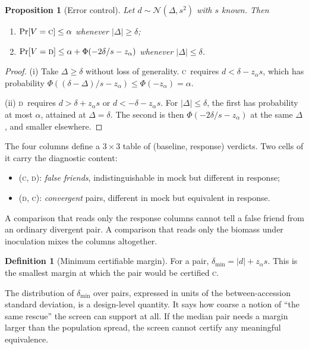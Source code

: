 \documentclass[10pt,twocolumn,a4paper]{article}
\newtheorem{proposition}{Proposition}[section]
\theoremstyle{definition}
\newtheorem{definition}{Definition}[section]
\theoremstyle{remark}
\newcommand{\CC}{\textsc{c}}
\newcommand{\DD}{\textsc{d}}
\begin{document}
\begin{proposition}[Error control]
\label{prop:error}
Let $d\sim\mathcal N(\Delta,s^2)$ with $s$ known. Then
\begin{enumerate}[label=(\roman*),leftmargin=1.8em,itemsep=0pt]
  \item $\Pr[V=\CC]\le\alpha$ whenever $|\Delta|\ge\delta$;
  \item $\Pr[V=\DD]\le\alpha+\Phi(-2\delta/s-z_\alpha)$ whenever
  $|\Delta|\le\delta$.
\end{enumerate}
\end{proposition}
\begin{proof}
(i) Take $\Delta\ge\delta$ without loss of generality. \CC\ requires
$d<\delta-z_\alpha s$, which has probability
$\Phi((\delta-\Delta)/s-z_\alpha)\le\Phi(-z_\alpha)=\alpha$.

(ii) \DD\ requires $d>\delta+z_\alpha s$ or $d<-\delta-z_\alpha s$. For
$|\Delta|\le\delta$, the first has probability at most $\alpha$, attained
at $\Delta=\delta$. The second is then
$\Phi(-2\delta/s-z_\alpha)$ at the same $\Delta$, and smaller elsewhere.
\end{proof}

The four columns define a $3\times 3$ table of (baseline, response)
verdicts. Two cells of it carry the diagnostic content:
\begin{itemize}[leftmargin=1.3em,itemsep=1pt]
  \item (\CC, \DD): \emph{false friends}, indistinguishable in mock but
  different in response;
  \item (\DD, \CC): \emph{convergent} pairs, different in mock but
  equivalent in response.
\end{itemize}
A comparison that reads only the response columns cannot tell a false
friend from an ordinary divergent pair. A comparison that reads only the
biomass under inoculation mixes the columns altogether.

\begin{definition}[Minimum certifiable margin]
\label{def:dmin}
For a pair, $\delta_{\min}=|d|+z_\alpha s$. This is the smallest margin at
which the pair would be certified \CC.
\end{definition}

The distribution of $\delta_{\min}$ over pairs, expressed in units of the
between-accession standard deviation, is a design-level quantity. It says
how coarse a notion of ``the same rescue'' the screen can support at
all. If the median pair needs a margin larger than the population spread,
the screen cannot certify any meaningful equivalence.
\end{document}

